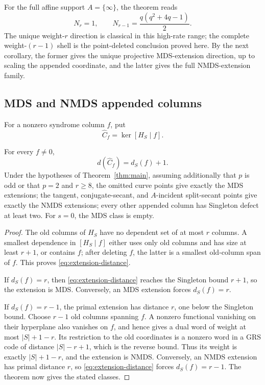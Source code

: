 For the full affine support \(A=\{\infty\}\), the theorem reads
\[
 N_r=1,\qquad N_{r-1}=\frac{q(q^2+4q-1)}2.
\]
The unique weight-\(r\) direction is classical in this high-rate range; the
complete weight-\((r-1)\) shell is the point-deleted conclusion proved here.
By the next corollary, the former gives the unique projective MDS-extension
direction, up to scaling the appended coordinate, and the latter gives the
full NMDS-extension family.

\subsection{MDS and NMDS appended columns}

For a nonzero syndrome column \(f\), put
\[
 \widehat C_f=\ker[H_S\mid f].
\]

\begin{corollary}
\label{cor:one-column-extensions}%
%
For every \(f\ne0\),
\begin{equation}\label{eq:extension-distance}
 d(\widehat C_f)=d_S(f)+1.
\end{equation}
Under the hypotheses of Theorem~\ref{thm:main}, assuming additionally that
\(p\) is odd or that \(p=2\) and \(r\geq8\), the
omitted curve points give exactly the MDS extensions; the tangent,
conjugate-secant, and \(A\)-incident split-secant points give exactly the
NMDS extensions; every other appended column has Singleton defect at least
two.  For \(s=0\), the MDS class is empty.
\end{corollary}

\begin{proof}
The old columns of \(H_S\) have no dependent set of at most \(r\) columns.
A smallest dependence in \([H_S\mid f]\) either uses only old columns and
has size at least \(r+1\), or contains \(f\); after deleting \(f\), the latter
is a smallest old-column span of \(f\).  This proves
\eqref{eq:extension-distance}.

If \(d_S(f)=r\), then \eqref{eq:extension-distance} reaches the Singleton
bound \(r+1\), so the extension is MDS.  Conversely, an MDS extension forces
\(d_S(f)=r\).

If \(d_S(f)=r-1\), the primal extension has distance \(r\), one below the
Singleton bound.  Choose \(r-1\) old columns spanning \(f\).  A nonzero
functional vanishing on their hyperplane also vanishes on \(f\), and hence
gives a dual word of weight at most \(|S|+1-r\).  Its restriction to the old
coordinates is a nonzero word in a GRS code of distance \(|S|-r+1\), which is
the reverse bound.  Thus its weight is exactly \(|S|+1-r\), and the extension
is NMDS.
Conversely, an NMDS extension has primal distance \(r\), so
\eqref{eq:extension-distance} forces \(d_S(f)=r-1\).  The theorem now gives
the stated classes.
\end{proof}

